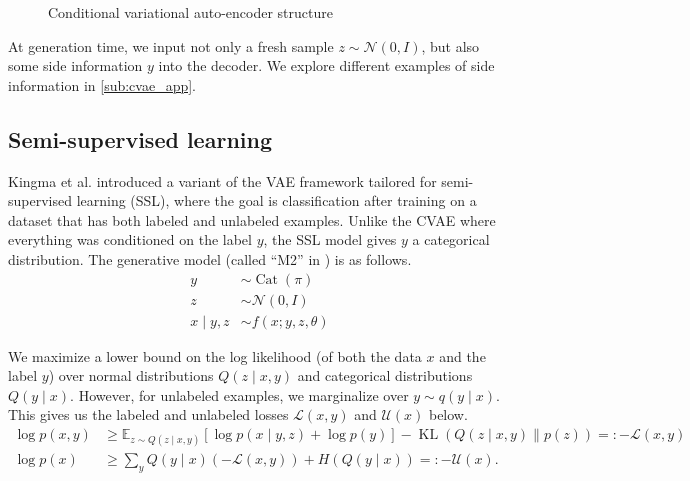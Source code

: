\documentclass[10pt]{article}
\newcommand{\op}[1]{\operatorname{#1}}
\newcommand{\E}{\mathbb{E}}
\begin{document}
\begin{figure}[!ht]
\centering
{}
\caption{Conditional variational auto-encoder structure}
\label{figure:cvae_model}
\end{figure}

At generation time, we input not only a fresh sample $z \sim \mathcal{N}(0,I)$, but also some side information $y$ into the decoder. We explore different examples of side information in \autoref{sub:cvae_app}. 
\subsection{Semi-supervised learning}
Kingma et al. \cite{kingma2014semi} introduced a variant of the VAE framework tailored for semi-supervised learning (SSL), where the goal is classification after training on a dataset that has both labeled and unlabeled examples. Unlike the CVAE where everything was conditioned on the label $y$, the SSL model gives $y$ a categorical distribution. The generative model (called ``M2'' in \cite{kingma2014semi}) is as follows.
\begin{align}
y &\sim \op{Cat}(\pi)\\
z &\sim \mathcal{N}(0,I)\\
x \mid y,z &\sim f(x; y,z,\theta)
\end{align}

We maximize a lower bound on the log likelihood (of both the data $x$ and the label $y$) over normal distributions $Q(z \mid x,y)$ and categorical distributions $Q(y \mid x)$. However, for unlabeled examples, we marginalize over $y \sim q(y \mid x)$. This gives us the labeled and unlabeled losses $\mathcal{L}(x,y)$ and $\mathcal{U}(x)$ below.
\begin{align}
\log p(x,y)
&\ge \E_{z \sim Q(z \mid x,y)}[\log p(x \mid y,z) + \log p(y)] - \op{KL}(Q(z \mid x,y) \| p(z)) =: - \mathcal{L}(x,y)\\
\log p(x) &\ge \sum_y Q(y \mid x) (-\mathcal{L}(x,y)) + H(Q(y \mid x)) =: -\mathcal{U}(x).
\end{align}
\end{document}
